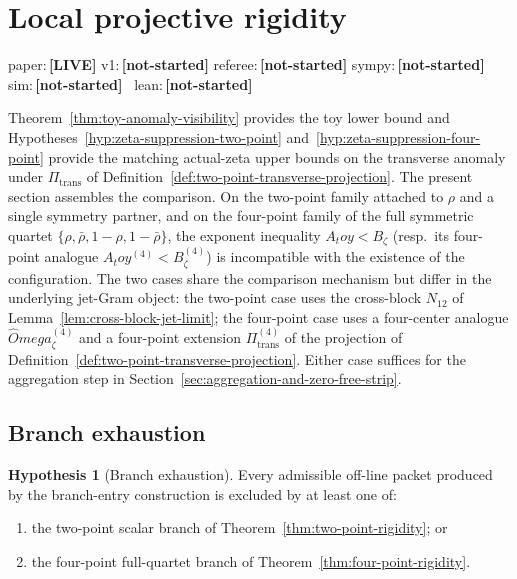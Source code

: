\documentclass[11pt,a4paper]{amsart}
\def\Omega{Omega}%
\def\toy{toy}%
\numberwithin{equation}{section}
\theoremstyle{plain}
\theoremstyle{definition}
\newtheorem{hypothesis}[theorem]{Hypothesis}
\newcommand{\z}{\zeta}
\newcommand{\Om}{\Omega}
\newcommand{\toy}{\mathrm{toy}}
\newcommand{\trans}{\mathrm{trans}}
\newcommand{\status}[1]{\textbf{\scriptsize[#1]}}
\newcommand{\statuspaper}[1]{\textsf{\footnotesize paper:}\,\status{#1}}
\newcommand{\statusmig}[1]{\textsf{\footnotesize v1:}\,\status{#1}}
\newcommand{\statusreferee}[1]{\textsf{\footnotesize referee:}\,\status{#1}}
\newcommand{\statussympy}[2][\relax]{%
  \textsf{\footnotesize sympy:}\,\status{#2}%
  \ifx\relax#1\else\,\textsf{\scriptsize\texttt{#1}}\fi%
}
\newcommand{\statussim}[2][\relax]{%
  \textsf{\footnotesize sim:}\,\status{#2}%
  \ifx\relax#1\else\,\textsf{\scriptsize\texttt{#1}}\fi%
}
\newcommand{\statuslean}[2][\relax]{%
  \textsf{\footnotesize lean:}\,\status{#2}%
  \ifx\relax#1\else\,\textsf{\scriptsize\texttt{#1}}\fi%
}
\begin{document}
\section{Local projective rigidity}
\label{sec:projective-rigidity}
\statuspaper{LIVE}\quad
\statusmig{not-started}\quad
\statusreferee{not-started}\quad
\statussympy{not-started}\quad
\statussim{not-started}\quad
\statuslean{not-started}
\par\medskip

Theorem~\ref{thm:toy-anomaly-visibility} provides the toy lower bound
and Hypotheses~\ref{hyp:zeta-suppression-two-point}
and~\ref{hyp:zeta-suppression-four-point} provide the matching
actual-zeta upper bounds on the transverse anomaly under
\(\Pi_\trans\) of Definition~\ref{def:two-point-transverse-projection}.  The present section assembles the comparison.  On the
two-point family attached to \(\rho\) and a single symmetry partner,
and on the four-point family of the full symmetric quartet
\(\{\rho,\bar\rho,1-\rho,1-\bar\rho\}\), the exponent inequality
\(A_\toy<B_\z\) (resp.\ its four-point analogue
\(A_\toy^{(4)}<B_\z^{(4)}\)) is incompatible with the existence of the
configuration.  The two cases share the comparison mechanism but differ
in the underlying jet-Gram object: the two-point case uses the cross-block
\(N_{12}\) of Lemma~\ref{lem:cross-block-jet-limit}; the four-point case
uses a four-center analogue \(\widehat\Om_\z^{(4)}\) and a four-point
extension \(\Pi_\trans^{(4)}\) of the projection of
Definition~\ref{def:two-point-transverse-projection}.  Either case suffices for the
aggregation step in
Section~\ref{sec:aggregation-and-zero-free-strip}.

\subsection{Branch exhaustion}
\label{subsec:branch-exhaustion}

\begin{hypothesis}[Branch exhaustion]
\label{hyp:branch-exhaustion}
Every admissible off-line packet produced by the branch-entry
construction is excluded by at least one of:
\begin{enumerate}[label=\textup{(\roman*)},leftmargin=*]
\item the two-point scalar branch of
      Theorem~\ref{thm:two-point-rigidity}; or
\item the four-point full-quartet branch of
      Theorem~\ref{thm:four-point-rigidity}.
\end{enumerate}
\end{hypothesis}
\end{document}
